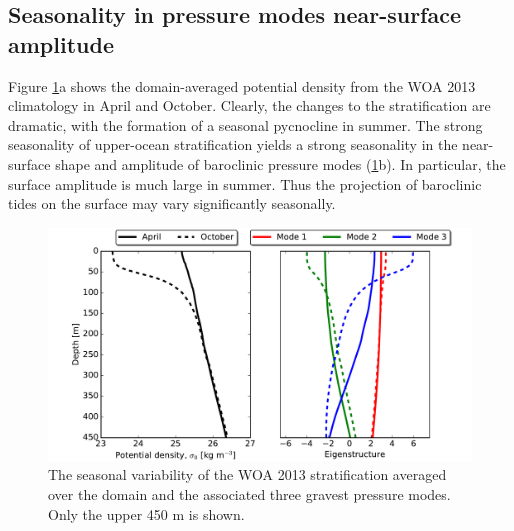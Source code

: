 \documentclass[grl]{agutex2015}
\begin{document}
\begin{article}
\section*{Seasonality in pressure modes near-surface amplitude}

Figure \ref{figS3}a shows the domain-averaged potential density from the WOA 2013
climatology in April and October. Clearly, the changes to the stratification
are dramatic, with the formation of a seasonal pycnocline in summer. The strong
seasonality of upper-ocean stratification yields a strong seasonality in the
near-surface shape and amplitude of baroclinic pressure modes (\ref{figS3}b).
In particular, the surface amplitude is much large in summer. Thus the projection
of baroclinic tides on the surface may vary significantly seasonally.


\begin{figure}[ht]
   \begin{center}
     \includegraphics[width=1.\textwidth]{figs/fig_s3.pdf}
  \caption{The seasonal variability of the WOA 2013 stratification averaged  over
  the domain and the associated three gravest pressure modes. Only the upper 450 m is shown.}
  \label{figS3}
  \end{center}
\end{figure}



\end{article}
\end{document}
